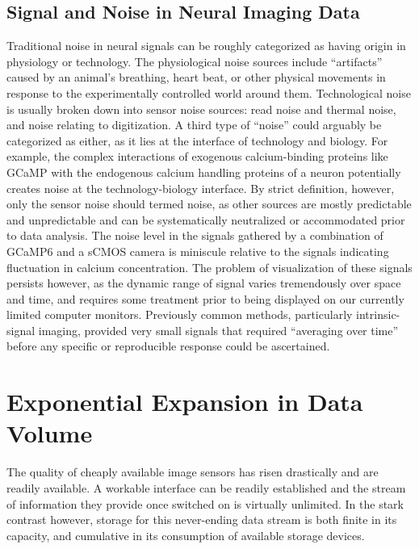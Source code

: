 \subsection{Signal and Noise in Neural Imaging Data}
\label{sec:signal-and-noise-in-neural-imaging-data}

Traditional noise in neural signals can be roughly categorized as having origin in physiology or technology.
The physiological noise sources include “artifacts” caused by an animal’s breathing, heart beat, or other physical movements in response to the experimentally controlled world around them.
Technological noise is usually broken down into sensor noise sources:  read noise and thermal noise, and noise relating to digitization.
A third type of “noise” could arguably be categorized as either, as it lies at the interface of technology and biology.
For example, the complex interactions of exogenous calcium-binding proteins like GCaMP with the endogenous calcium handling proteins of a neuron potentially creates noise at the technology-biology interface.
By strict definition, however, only the sensor noise should termed noise, as other sources are mostly predictable and unpredictable and can be systematically neutralized or accommodated prior to data analysis.
The noise level in the signals gathered by a combination of GCaMP6 and a sCMOS camera is miniscule relative to the signals indicating fluctuation in calcium concentration.
The problem of visualization of these signals persists however, as the dynamic range of signal varies tremendously over space and time, and requires some treatment prior to being displayed on our currently limited computer monitors.
Previously common methods, particularly intrinsic-signal imaging, provided very small signals that required “averaging over time” before any specific or reproducible response could be ascertained.

\section{Exponential Expansion in Data Volume}
\label{sec:exponential-expansion-in-data-volume}

The quality of cheaply available image sensors has risen drastically and are readily available.
A workable interface can be readily established and the stream of information they provide once switched on is virtually unlimited.
In the stark contrast however, storage for this never-ending data stream is both finite in its capacity, and cumulative in its consumption of available storage devices.

